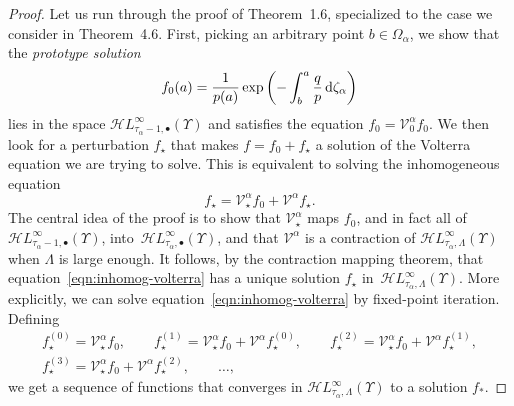 \documentclass[pdftex]{sigma}
\newcommand{\singexp}[2]{\mathcal{H}L^\infty_{#1, #2}}
\newcommand{\singexpalg}[1]{\singexp{#1}{\bullet}}
\newcommand{\volterra}{\mathcal{V}}
\newcommand{\hardpart}{\mathcal{V}_0}
\newcommand{\softpart}{\mathcal{V}_\star}
\newcommand{\solwhole}{f}
\newcommand{\solproto}{f_0}
\newcommand{\solptb}{f_\star}
\numberwithin{equation}{section}
\begin{document}
\begin{proof}
Let us run through the proof of Theorem~1.6, specialized to the case we consider in Theorem~4.6. First, picking an arbitrary point $b \in \Omega_\alpha$, we show that the {\em prototype solution}
\[ \solproto(a) = \frac{1}{p(a)} \exp\left(-\int_{b}^{a}\frac{q}{p} \,{\rm d}\zeta_\alpha\right) \]
lies in the space $\singexpalg{\tau_\alpha - 1}(\Upsilon)$ and satisfies the equation $\solproto = \hardpart^\alpha \solproto$. We then look for a perturbation $\solptb$ that makes $\solwhole = \solproto + \solptb$ a solution of the Volterra equation we are trying to solve. This is equivalent to solving the inhomogeneous equation
\begin{equation}\label{eqn:inhomog-volterra}
\solptb = \softpart^\alpha \solproto + \volterra^\alpha \solptb.
\end{equation}
The central idea of the proof is to show that $\softpart^\alpha$ maps $\solproto$, and in fact all of $\singexpalg{\tau_\alpha - 1}(\Upsilon)$, into~$\singexpalg{\tau_\alpha}(\Upsilon)$, and that $\volterra^\alpha$ is a contraction of $\singexp{\tau_\alpha}{\Lambda}(\Upsilon)$ when $\Lambda$ is large enough. It follows, by the contraction mapping theorem, that equation~\eqref{eqn:inhomog-volterra} has a unique solution $\solptb$ in~$\singexp{\tau_\alpha}{\Lambda}(\Upsilon)$. More explicitly, we can solve equation~\eqref{eqn:inhomog-volterra} by fixed-point iteration. Defining
\begin{gather*}
\solptb^{(0)} = \softpart^\alpha \solproto ,\qquad
\solptb^{(1)} = \softpart^\alpha \solproto + \volterra^\alpha \solptb^{(0)} ,\qquad
\solptb^{(2)} = \softpart^\alpha \solproto + \volterra^\alpha \solptb^{(1)}, \\
\solptb^{(3)} = \softpart^\alpha \solproto + \volterra^\alpha \solptb^{(2)}, \qquad
\dots,
\end{gather*}
we get a sequence of functions that converges in $\singexp{\tau_\alpha}{\Lambda}(\Upsilon)$ to a solution $f_*$.


\end{proof}
\end{document}
